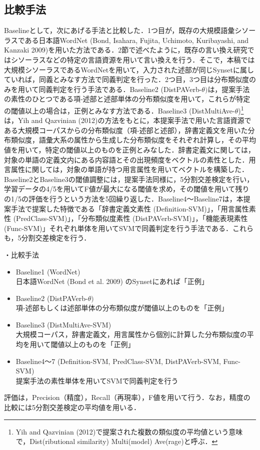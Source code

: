 \documentclass[japanese]{jnlp_1.4}
\begin{document}
\subsection{比較手法}

Baselineとして，次にあげる手法と比較した．1つ目が，既存の大規模語彙シソーラスである日本語WordNet (Bond, Isahara, Fujita, Uchimoto, Kuribayashi, and Kanzaki 2009)を用いた方法である．2節で述べたように，既存の言い換え研究ではシソーラスなどの特定の言語資源を用いて言い換えを行う．そこで，本稿では大規模シソーラスであるWordNetを用いて，入力された述部が同じSynsetに属していれば，同義とみなす方法で同義判定を行った．2つ目，3つ目は分布類似度のみを用いて同義判定を行う手法である．Baseline2 (DistPAVerb-$\theta)$は，提案手法の素性のひとつである項‐述部と述部単体の分布類似度を用いて，これらが特定の閾値以上の場合は，正例とみなす方法である．Baseline3 (DistMultiAve-$\theta$)\footnote{Yih and Qazvinian (2012)で提案された複数の類似度の平均値という意味で，Dist(ributional similarity) Multi(model) Ave(rage)と呼ぶ．}は，Yih and Qazvinian (2012)の方法をもとに，本提案手法で用いた言語資源である大規模コーパスからの分布類似度（項‐述部と述部），辞書定義文を用いた分布類似度，語彙大系の属性から生成した分布類似度をそれぞれ計算し，その平均値を用いて，特定の閾値以上のものを正例とみなした．辞書定義文に関しては，対象の単語の定義文内にある内容語とその出現頻度をベクトルの素性とした．用言属性に関しては，対象の単語が持つ用言属性を用いてベクトルを構築した．Baseline2とBaseline3の閾値調整には，提案手法同様に，5分割交差検定を行い，学習データの4/5を用いてF値が最大になる閾値を求め，その閾値を用いて残りの1/5の評価を行うという方法を5回繰り返した．Baseline4〜Baseline7は，本提案手法で提案した特徴である「辞書定義文素性 (Definition-SVM)」，「用言属性素性 (PredClass-SVM)」，「分布類似度素性 (DistPAVerb-SVM)」，「機能表現素性 (Func-SVM)」それぞれ単体を用いてSVMで同義判定を行う手法である．これらも，5分割交差検定を行う．


・比較手法
\begin{itemize}
\item Baseline1 (WordNet)\\
 日本語WordNet (Bond et al. 2009) のSynsetにあれば「正例」
\item Baseline2 (DistPAVerb-$\theta)$\\
 項‐述部もしくは述部単体の分布類似度が閾値以上のものを「正例」
\item Baseline3 (DistMultiAve-SVM)\\
 大規模コーパス，辞書定義文，用言属性から個別に計算した分布類似度の平均を用いて閾値以上のものを「正例」
\item Baseline4〜7 (Definition-SVM, PredClass-SVM, DistPAVerb-SVM, Func-SVM) \\
 提案手法の素性単体を用いてSVMで同義判定を行う
\end{itemize}
評価は，Precision（精度），Recall（再現率），F値を用いて行う．なお，精度の比較には5分割交差検定の平均値を用いる．
\end{document}
